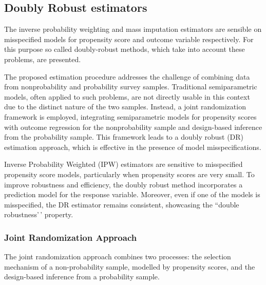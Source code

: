 \documentclass[
]{jss}
\begin{document}
\begin{table}[H]
\begin{tabular}{p{2cm} p{6.5cm} p{6.5cm}}
\end{tabular}
\end{table}

\hypertarget{doubly-robust-estimators}{%
\subsection{Doubly Robust estimators}\label{doubly-robust-estimators}}

The inverse probability weighting and mass imputation estimators are
sensible on misspecified models for propensity score and outcome
variable respectively. For this purpose so called doubly-robust methods,
which take into account these problems, are presented.

The proposed estimation procedure addresses the challenge of combining
data from nonprobability and probability survey samples. Traditional
semiparametric models, often applied to such problems, are not directly
usable in this context due to the distinct nature of the two samples.
Instead, a joint randomization framework is employed, integrating
semiparametric models for propensity scores with outcome regression for
the nonprobability sample and design-based inference from the
probability sample. This framework leads to a doubly robust (DR)
estimation approach, which is effective in the presence of model
misspecifications.

Inverse Probability Weighted (IPW) estimators are sensitive to
misspecified propensity score models, particularly when propensity
scores are very small. To improve robustness and efficiency, the doubly
robust method incorporates a prediction model for the response variable.
Moreover, even if one of the models is misspecified, the DR estimator
remains consistent, showcasing the ``double robustness'\,' property.

\hypertarget{joint-randomization-approach}{%
\subsubsection{Joint Randomization
Approach}\label{joint-randomization-approach}}

The joint randomization approach combines two processes: the selection
mechanism of a non-probability sample, modelled by propensity scores,
and the design-based inference from a probability sample.
\end{document}
